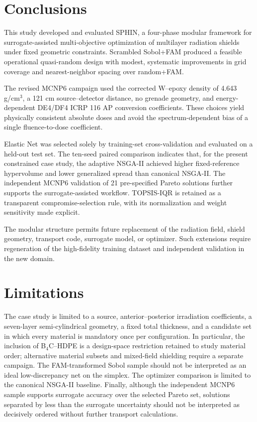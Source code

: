 \documentclass[preprint,12pt]{elsarticle}
\begin{document}
\section{Conclusions}
This study developed and evaluated SPHIN, a four-phase modular framework for surrogate-assisted multi-objective optimization of multilayer radiation shields under fixed geometric constraints. Scrambled Sobol+FAM produced a feasible operational quasi-random design with modest, systematic improvements in grid coverage and nearest-neighbor spacing over random+FAM.

The revised MCNP6 campaign used the corrected W--epoxy density of 4.643 g/cm$^3$, a 121 cm source--detector distance, no grenade geometry, and energy-dependent DE4/DF4 ICRP 116 AP conversion coefficients. These choices yield physically consistent absolute doses and avoid the spectrum-dependent bias of a single fluence-to-dose coefficient.

Elastic Net was selected solely by training-set cross-validation and evaluated on a held-out test set. The ten-seed paired comparison indicates that, for the present constrained case study, the adaptive NSGA-II achieved higher fixed-reference hypervolume and lower generalized spread than canonical NSGA-II. The independent MCNP6 validation of 21 pre-specified Pareto solutions further supports the surrogate-assisted workflow. TOPSIS-IQR is retained as a transparent compromise-selection rule, with its normalization and weight sensitivity made explicit.

The modular structure permits future replacement of the radiation field, shield geometry, transport code, surrogate model, or optimizer. Such extensions require regeneration of the high-fidelity training dataset and independent validation in the new domain.

\section*{Limitations}
The case study is limited to a  source, anterior--posterior irradiation coefficients, a seven-layer semi-cylindrical geometry, a fixed total thickness, and a candidate set in which every material is mandatory once per configuration. In particular, the inclusion of B$_4$C--HDPE is a design-space restriction retained to study material order; alternative material subsets and mixed-field shielding require a separate campaign. The FAM-transformed Sobol sample should not be interpreted as an ideal low-discrepancy net on the simplex. The optimizer comparison is limited to the canonical NSGA-II baseline. Finally, although the independent MCNP6 sample supports surrogate accuracy over the selected Pareto set, solutions separated by less than the surrogate uncertainty should not be interpreted as decisively ordered without further transport calculations.
\end{document}
